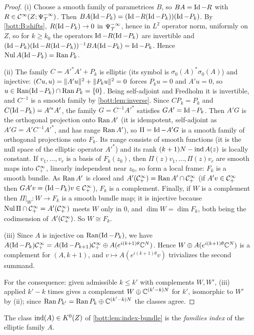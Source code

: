 \begin{proof}
  (i) Choose a smooth family of parametrices $B$, so $BA=\operatorname{Id}-R$ with
  $R\in\mathcal{C}^\infty(Z;\Psi^{-\infty}_{\mathcal{T}})$. Then $BA(\operatorname{Id}-P_k)=(\operatorname{Id}-R(\operatorname{Id}-P_k))(\operatorname{Id}-P_k)$. By
  \ref{bott:B:shifts}, $R(\operatorname{Id}-P_k)\to0$ in $\Psi^{-\infty}_{\mathcal{T}}$, hence in $L^2$ operator norm,
  uniformly on $Z$, so for $k\ge k_0$ the operators $\operatorname{Id}-R(\operatorname{Id}-P_k)$ are invertible and
  $(\operatorname{Id}-P_k)(\operatorname{Id}-R(\operatorname{Id}-P_k))^{-1}BA(\operatorname{Id}-P_k)=\operatorname{Id}-P_k$. Hence $\operatorname{Nul} A(\operatorname{Id}-P_k)=\operatorname{Ran} P_k$.

  (ii) The family $C=A'^*A'+P_k$ is elliptic (its symbol is $\sigma_0(A)^*\sigma_0(A)$) and
  injective: $( Cu, u)=\lVert A'u\rVert^2+\lVert P_ku\rVert^2=0$ forces $P_ku=0$ and $A'u=0$, so
  $u\in\operatorname{Ran}(\operatorname{Id}-P_k)\cap\operatorname{Ran} P_k=\{0\}$. Being self-adjoint and Fredholm it is invertible,
  and $C^{-1}$ is a smooth family by \cref{bott:lem:inverse}. Since $CP_k=P_k$ and
  $C(\operatorname{Id}-P_k)=A'^*A'$, the family $G=C^{-1}A'^*$ satisfies $GA'=\operatorname{Id}-P_k$. Then $A'G$ is the
  orthogonal projection onto $\operatorname{Ran} A'$ (it is idempotent, self-adjoint as
  $A'G=A'C^{-1}A'^*$, and has range $\operatorname{Ran} A'$), so $\Pi=\operatorname{Id}-A'G$ is a smooth family of
  orthogonal projections onto $F_k$. Its range consists of smooth functions (it is the null
  space of the elliptic operator $A'^*$) and its rank $(k+1)N-\operatorname{ind} A(z)$ is locally
  constant. If $v_1,\dots,v_r$ is a basis of $F_k(z_0)$, then $\Pi(z)v_1,\dots,\Pi(z)v_r$
  are smooth maps into $\mathcal{C}^\infty_+$, linearly independent near $z_0$, so form a local frame:
  $F_k$ is a smooth bundle. As $\operatorname{Ran} A'$ is closed and $A'(\mathcal{C}^\infty_+)=\operatorname{Ran} A'\cap\mathcal{C}^\infty_+$ (if
  $A'v\in\mathcal{C}^\infty_+$ then $GA'v=(\operatorname{Id}-P_k)v\in\mathcal{C}^\infty_+$), $F_k$ is a complement. Finally, if $W$ is a
  complement then $\Pi|_W\colon W\to F_k$ is a smooth bundle map; it is injective because
  $\operatorname{Nul}\Pi\cap\mathcal{C}^\infty_+=A'(\mathcal{C}^\infty_+)$ meets $W$ only in $0$, and $\dim W=\dim F_k$, both being the
  codimension of $A'(\mathcal{C}^\infty_+)$. So $W\cong F_k$.

  (iii) Since $A$ is injective on $\operatorname{Ran}(\operatorname{Id}-P_k)$, we have
  $A(\operatorname{Id}-P_k)\mathcal{C}^\infty_+=A(\operatorname{Id}-P_{k+1})\mathcal{C}^\infty_+\oplus A(e^{i(k+1)\theta}\mathbb{C}^N)$. Hence
  $W\oplus A(e^{i(k+1)\theta}\mathbb{C}^N)$ is a complement for $(A,k+1)$, and
  $v\mapsto A(e^{i(k+1)\theta}v)$ trivializes the second summand.

  For the consequence: given admissible $k\le k'$ with complements $W,W'$, (iii)
  applied $k'-k$ times gives a complement $W\oplus\mathbb{C}^{(k'-k)N}$ for $k'$, isomorphic to
  $W'$ by (ii); since $\operatorname{Ran} P_{k'}=\operatorname{Ran} P_k\oplus\mathbb{C}^{(k'-k)N}$ the classes agree.
\end{proof}

\begin{definition}\label{bott:def:families-index}
  The class $\operatorname{ind}(A)\in K^0(Z)$ of \cref{bott:lem:index-bundle} is the \emph{families
  index} of the elliptic family $A$.
\end{definition}

